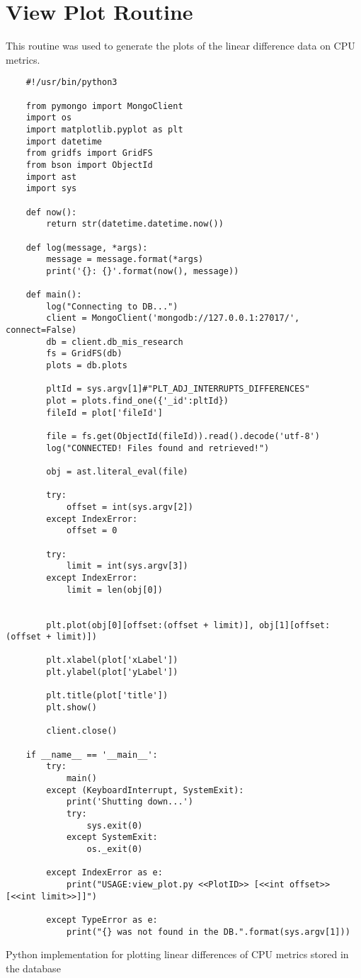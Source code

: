 \chapter{View Plot Routine}

This routine was used to generate the plots of the linear difference data on CPU metrics.
\begin{code}
    \begin{verbatim}
    #!/usr/bin/python3

    from pymongo import MongoClient
    import os
    import matplotlib.pyplot as plt
    import datetime
    from gridfs import GridFS
    from bson import ObjectId
    import ast
    import sys
    
    def now():
    	return str(datetime.datetime.now())
    
    def log(message, *args):
    	message = message.format(*args)
    	print('{}: {}'.format(now(), message))
    
    def main():
    	log("Connecting to DB...")
    	client = MongoClient('mongodb://127.0.0.1:27017/', connect=False)
    	db = client.db_mis_research
    	fs = GridFS(db)
    	plots = db.plots
    
    	pltId = sys.argv[1]#"PLT_ADJ_INTERRUPTS_DIFFERENCES"
    	plot = plots.find_one({'_id':pltId})
    	fileId = plot['fileId']
    
    	file = fs.get(ObjectId(fileId)).read().decode('utf-8')
    	log("CONNECTED! Files found and retrieved!")
    
    	obj = ast.literal_eval(file)
    
    	try:
    		offset = int(sys.argv[2])
    	except IndexError:
    		offset = 0
    
    	try:
    		limit = int(sys.argv[3])
    	except IndexError:
    		limit = len(obj[0]) 
    
    
    	plt.plot(obj[0][offset:(offset + limit)], obj[1][offset:(offset + limit)])
    
    	plt.xlabel(plot['xLabel']) 
    	plt.ylabel(plot['yLabel']) 
    	
    	plt.title(plot['title'])
    	plt.show()
    
    	client.close()
    
    if __name__ == '__main__':
    	try:
    		main()
    	except (KeyboardInterrupt, SystemExit):
    		print('Shutting down...')
    		try:
    			sys.exit(0)
    		except SystemExit:
    			os._exit(0)
    
    	except IndexError as e:
    		print("USAGE:view_plot.py <<PlotID>> [<<int offset>> [<<int limit>>]]")
    
    	except TypeError as e:
    		print("{} was not found in the DB.".format(sys.argv[1]))
    \end{verbatim}
    \caption{Python implementation for plotting linear differences of CPU metrics stored in the database}
    \label{lst:py_class_float}
\end{code}